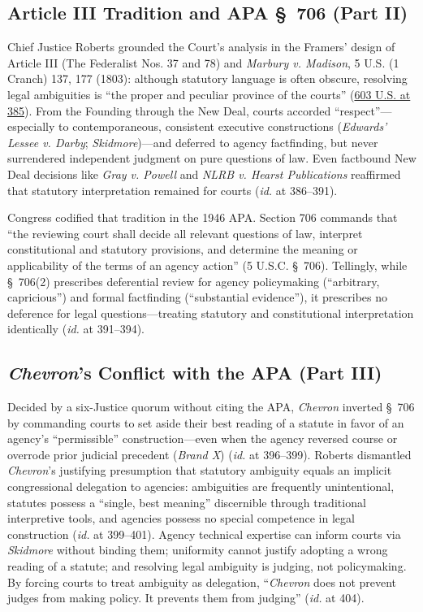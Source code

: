 \documentclass[12pt]{article}
\begin{document}
\subsection{Article III Tradition and APA \S~706 (Part II)}

Chief Justice Roberts grounded the Court's analysis in the Framers' design of Article III (The Federalist Nos. 37 and 78) and \textit{Marbury v. Madison}, 5 U.S. (1 Cranch) 137, 177 (1803): although statutory language is often obscure, resolving legal ambiguities is ``the proper and peculiar province of the courts'' (\href{https://www.law.cornell.edu/supremecourt/text/22-451}{603 U.S. at 385}). From the Founding through the New Deal, courts accorded ``respect''---especially to contemporaneous, consistent executive constructions (\textit{Edwards' Lessee v. Darby}; \textit{Skidmore})---and deferred to agency factfinding, but never surrendered independent judgment on pure questions of law. Even factbound New Deal decisions like \textit{Gray v. Powell} and \textit{NLRB v. Hearst Publications} reaffirmed that statutory interpretation remained for courts (\textit{id.} at 386--391).

Congress codified that tradition in the 1946 APA. Section 706 commands that ``the reviewing court shall decide all relevant questions of law, interpret constitutional and statutory provisions, and determine the meaning or applicability of the terms of an agency action'' (5 U.S.C. \S~706). Tellingly, while \S~706(2) prescribes deferential review for agency policymaking (``arbitrary, capricious'') and formal factfinding (``substantial evidence''), it prescribes no deference for legal questions---treating statutory and constitutional interpretation identically (\textit{id.} at 391--394).

\subsection{\textit{Chevron}'s Conflict with the APA (Part III)}

Decided by a six-Justice quorum without citing the APA, \textit{Chevron} inverted \S~706 by commanding courts to set aside their best reading of a statute in favor of an agency's ``permissible'' construction---even when the agency reversed course or overrode prior judicial precedent (\textit{Brand X}) (\textit{id.} at 396--399). Roberts dismantled \textit{Chevron}'s justifying presumption that statutory ambiguity equals an implicit congressional delegation to agencies: ambiguities are frequently unintentional, statutes possess a ``single, best meaning'' discernible through traditional interpretive tools, and agencies possess no special competence in legal construction (\textit{id.} at 399--401). Agency technical expertise can inform courts via \textit{Skidmore} without binding them; uniformity cannot justify adopting a wrong reading of a statute; and resolving legal ambiguity is judging, not policymaking. By forcing courts to treat ambiguity as delegation, ``\textit{Chevron} does not prevent judges from making policy. It prevents them from judging'' (\textit{id.} at 404).
\end{document}
